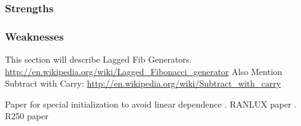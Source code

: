 \subsubsection{Strengths}
\subsubsection{Weaknesses}

This section will describe Lagged Fib Generators.
\url{http://en.wikipedia.org/wiki/Lagged_Fibonacci_generator}
Also Mention Subtract with Carry:
\url{http://en.wikipedia.org/wiki/Subtract_with_carry}

Paper for special initialization to avoid linear dependence \cite{Matsumoto:2007:CDI:1276927.1276928}.
RANLUX paper \cite{luscher1994portable}.
R250 paper \cite{kirkpatrick1981very}
